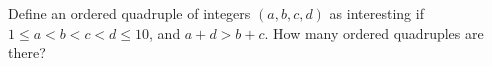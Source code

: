 Define an ordered quadruple of integers $(a, b, c, d)$ as interesting if $1 \le a<b<c<d \le 10$, and $a+d>b+c$. How many ordered quadruples are there?